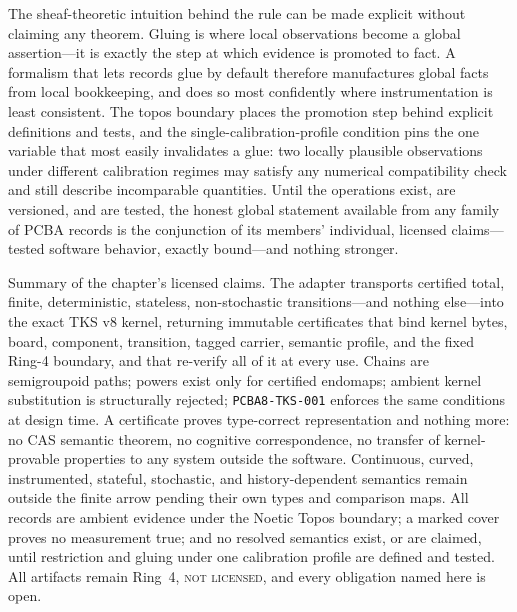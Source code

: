 The sheaf-theoretic intuition behind the rule can be made explicit without claiming any theorem. Gluing is where local observations become a global assertion---it is exactly the step at which evidence is promoted to fact. A formalism that lets records glue by default therefore manufactures global facts from local bookkeeping, and does so most confidently where instrumentation is least consistent. The topos boundary places the promotion step behind explicit definitions and tests, and the single-calibration-profile condition pins the one variable that most easily invalidates a glue: two locally plausible observations under different calibration regimes may satisfy any numerical compatibility check and still describe incomparable quantities. Until the operations exist, are versioned, and are tested, the honest global statement available from any family of PCBA records is the conjunction of its members' individual, licensed claims---tested software behavior, exactly bound---and nothing stronger.

\begin{boundary}\label{ch09:bd:closing}
Summary of the chapter's licensed claims. The adapter transports certified total, finite, deterministic, stateless, non-stochastic transitions---and nothing else---into the exact TKS v8 kernel, returning immutable certificates that bind kernel bytes, board, component, transition, tagged carrier, semantic profile, and the fixed Ring-4 boundary, and that re-verify all of it at every use. Chains are semigroupoid paths; powers exist only for certified endomaps; ambient kernel substitution is structurally rejected; \texttt{PCBA8-TKS-001} enforces the same conditions at design time. A certificate proves type-correct representation and nothing more: no CAS semantic theorem, no cognitive correspondence, no transfer of kernel-provable properties to any system outside the software. Continuous, curved, instrumented, stateful, stochastic, and history-dependent semantics remain outside the finite arrow pending their own types and comparison maps. All records are ambient evidence under the Noetic Topos boundary; a marked cover proves no measurement true; and no resolved semantics exist, or are claimed, until restriction and gluing under one calibration profile are defined and tested. All artifacts remain Ring~4, \textsc{not licensed}, and every obligation named here is open.
\end{boundary}

